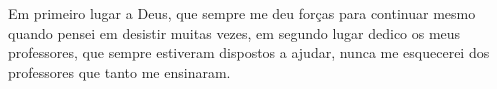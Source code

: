 \documentclass[
12pt,				 %
openright,           %
oneside,			 %
a4paper,			 %
sumario=tradicional, %
chapter=TITLE,		 %
fleqn,				 %
english,
spanish,
brazil,				 %
]{abntex2}%
\begin{document}
	\frenchspacing 
	
	\newcommand{\listofgraficosname}{Lista de gráficos}
	\renewcommand{\cftgraficoname}{\graficoname\space}
	\renewcommand*{\cftgraficoaftersnum}{\hfill\textendash\hfill}
	
	\newcommand{\listofquadrosname}{Lista de quadros}
	\renewcommand{\cftquadroname}{\quadroname\space}
	\renewcommand*{\cftquadroaftersnum}{\hfill\textendash\hfill}
	
	\newcommand{\listofalgoritmosname}{Lista de Algoritmos}
	\renewcommand{\cftalgorithmname}{\algorithmname\space}
	\renewcommand*{\cftalgorithmaftersnum}{\hfill\textendash\hfill}

\pretextual

\imprimircapa
\clearpage

\imprimirfolhaderosto
\clearpage






\begin{agradecimentos}
Em primeiro lugar a Deus, que sempre me deu forças para continuar mesmo quando pensei em desistir muitas vezes, em segundo lugar dedico os meus professores, que sempre estiveram dispostos a ajudar, nunca me esquecerei dos professores que tanto me ensinaram.

\end{agradecimentos}
\end{document}
